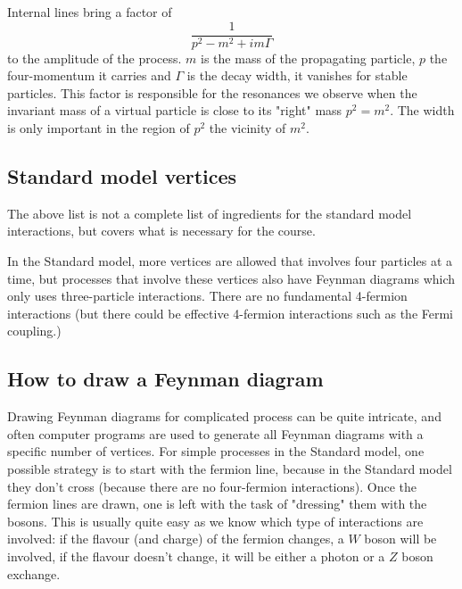 \documentclass[12pt]{article}
\begin{document}
Internal lines bring a factor of
\[\frac{1}{p^2-m^2+im\Gamma}\]
to the amplitude of the process. $m$ is the mass of the propagating particle, $p$ the four-momentum it carries and $\Gamma$ is the decay width, it vanishes for stable particles. This factor is responsible for the resonances we observe when the invariant mass of a virtual particle is close to its "right" mass $p^2=m^2$. The width is only important in the region of $p^2$ the vicinity of $m^2$. 
\subsection{Standard model vertices}
The above list is not a complete list of ingredients for the standard model interactions, but covers what is necessary for the course. 

In the Standard model, more vertices are allowed that involves four particles at a time, but processes that involve these vertices also have Feynman diagrams which only uses three-particle interactions. There are no fundamental 4-fermion interactions (but there could be effective 4-fermion interactions such as the Fermi coupling.)
\subsection{How to draw a Feynman diagram}
Drawing Feynman diagrams for complicated process can be quite intricate, and often computer programs are used to generate all Feynman diagrams with a specific number of vertices. For simple processes in the Standard model, one possible strategy is to start with the fermion line, because in the Standard model they don't cross (because there are no four-fermion interactions). Once the fermion lines are drawn, one is left with the task of "dressing" them with the bosons. This is usually quite easy as we know which type of interactions are involved: if the flavour (and charge) of the fermion changes, a $W$ boson will be involved, if the flavour doesn't change, it will be either a photon or a $Z$ boson exchange.
\clearpage
\end{document}
